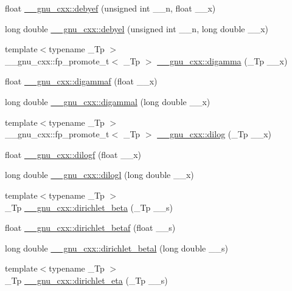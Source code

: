 \begin{DoxyCompactItemize}
\item 
float \hyperlink{group__mathsf__gnu_ga683d3a885913b52db128aa5d624984a4}{\+\_\+\+\_\+gnu\+\_\+cxx\+::debyef} (unsigned int \+\_\+\+\_\+n, float \+\_\+\+\_\+x)
\item 
long double \hyperlink{group__mathsf__gnu_ga2db11e767b89bbd36be6ebfadda3401f}{\+\_\+\+\_\+gnu\+\_\+cxx\+::debyel} (unsigned int \+\_\+\+\_\+n, long double \+\_\+\+\_\+x)
\item 
{\footnotesize template$<$typename \+\_\+\+Tp $>$ }\\\+\_\+\+\_\+gnu\+\_\+cxx\+::fp\+\_\+promote\+\_\+t$<$ \+\_\+\+Tp $>$ \hyperlink{group__mathsf__gnu_ga7b87300edf8754d959e1d94fe0c9246e}{\+\_\+\+\_\+gnu\+\_\+cxx\+::digamma} (\+\_\+\+Tp \+\_\+\+\_\+x)
\item 
float \hyperlink{group__mathsf__gnu_ga65b58ffe1d02ccda1113539b62d87b94}{\+\_\+\+\_\+gnu\+\_\+cxx\+::digammaf} (float \+\_\+\+\_\+x)
\item 
long double \hyperlink{group__mathsf__gnu_gaaa1bf1503709175915cb81bcd4355ccf}{\+\_\+\+\_\+gnu\+\_\+cxx\+::digammal} (long double \+\_\+\+\_\+x)
\item 
{\footnotesize template$<$typename \+\_\+\+Tp $>$ }\\\+\_\+\+\_\+gnu\+\_\+cxx\+::fp\+\_\+promote\+\_\+t$<$ \+\_\+\+Tp $>$ \hyperlink{group__mathsf__gnu_ga4185ee1a0f9189a18085f65d52b6bc9b}{\+\_\+\+\_\+gnu\+\_\+cxx\+::dilog} (\+\_\+\+Tp \+\_\+\+\_\+x)
\item 
float \hyperlink{group__mathsf__gnu_ga901091e0e7ce7d6113ae6a86f4865a92}{\+\_\+\+\_\+gnu\+\_\+cxx\+::dilogf} (float \+\_\+\+\_\+x)
\item 
long double \hyperlink{group__mathsf__gnu_gae90c13ee690ebaf10a18a900fe2646f9}{\+\_\+\+\_\+gnu\+\_\+cxx\+::dilogl} (long double \+\_\+\+\_\+x)
\item 
{\footnotesize template$<$typename \+\_\+\+Tp $>$ }\\\+\_\+\+Tp \hyperlink{group__mathsf__gnu_ga87466a2d429a2815d794acc21c882b08}{\+\_\+\+\_\+gnu\+\_\+cxx\+::dirichlet\+\_\+beta} (\+\_\+\+Tp \+\_\+\+\_\+s)
\item 
float \hyperlink{group__mathsf__gnu_ga9bb40e20b18e3eb822e70af955940830}{\+\_\+\+\_\+gnu\+\_\+cxx\+::dirichlet\+\_\+betaf} (float \+\_\+\+\_\+s)
\item 
long double \hyperlink{group__mathsf__gnu_gaed6fd85a4577f4de66d74742a1850a13}{\+\_\+\+\_\+gnu\+\_\+cxx\+::dirichlet\+\_\+betal} (long double \+\_\+\+\_\+s)
\item 
{\footnotesize template$<$typename \+\_\+\+Tp $>$ }\\\+\_\+\+Tp \hyperlink{group__mathsf__gnu_gae46e26e4107675d285c79a2d6202e6c7}{\+\_\+\+\_\+gnu\+\_\+cxx\+::dirichlet\+\_\+eta} (\+\_\+\+Tp \+\_\+\+\_\+s)

\end{DoxyCompactItemize}
